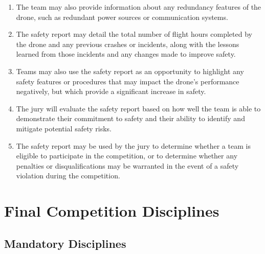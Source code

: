 \begin{enumerate}
    \item The team may also provide information about any redundancy features of the drone, such as redundant power sources or communication systems.
    \item The safety report may detail the total number of flight hours completed by the drone and any previous crashes or incidents, along with the lessons learned from those incidents and any changes made to improve safety.
    \item Teams may also use the safety report as an opportunity to highlight any safety features or procedures that may impact the drone's performance negatively, but which provide a significant increase in safety.
    \item The jury will evaluate the safety report based on how well the team is able to demonstrate their commitment to safety and their ability to identify and mitigate potential safety risks.
    \item The safety report may be used by the jury to determine whether a team is eligible to participate in the competition, or to determine whether any penalties or disqualifications may be warranted in the event of a safety violation during the competition.
    \end{enumerate}

    \section{Final Competition Disciplines}
    \subsection{Mandatory Disciplines}

